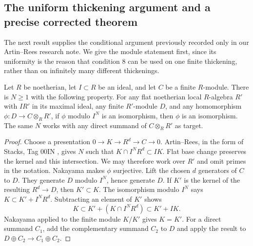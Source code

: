 \subsection{The uniform thickening argument and a precise corrected theorem}

The next result supplies the conditional argument previously recorded only
in our Artin--Rees research note. We give the module statement first,
since its uniformity is the reason that condition 8 can be used on one
finite thickening, rather than on infinitely many different thickenings.

\begin{lemma}\label{A:uniform-AR}
Let $R$ be noetherian, let $I\subset R$ be an ideal, and let $C$ be a
finite $R$-module. There is $N\geq1$ with the following property. For
any flat noetherian local $R$-algebra $R'$ with $IR'$ in its maximal
ideal, any finite $R'$-module $D$, and any homomorphism
$\phi:D\to C\otimes_RR'$, if $\phi$ modulo $I^N$ is an isomorphism,
then $\phi$ is an isomorphism. The same $N$ works with any direct
summand of $C\otimes_RR'$ as target.
\end{lemma}
\begin{proof}
Choose a presentation $0\to K\to R^d\to C\to0$.
Artin--Rees, in the form of Stacks, Tag 00IN
\cite{Stacks00IN}, gives $N$ such that
$K\cap I^NR^d\subset IK$. Flat base change preserves the kernel
and this intersection. We may therefore work over $R'$ and omit
primes in the notation. Nakayama makes $\phi$ surjective. Lift the
chosen $d$ generators of $C$ to $D$. They generate $D$ modulo
$I^N$, hence generate $D$. If $K'$ is the kernel of the resulting
$R^d\to D$, then $K'\subset K$. The isomorphism modulo $I^N$ says
$K\subset K'+I^NR^d$. Subtracting an element of $K'$ shows
\[
 K\subset K'+(K\cap I^NR^d)\subset K'+IK.
\]
Nakayama applied to the finite module $K/K'$ gives $K=K'$.
For a direct summand $C_1$, add the complementary summand $C_2$
to $D$ and apply the result to $D\oplus C_2\to C_1\oplus C_2$.
\end{proof}

